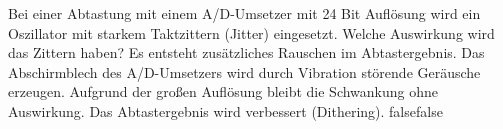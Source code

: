     {Bei einer Abtastung mit einem A/D-Umsetzer mit 24 Bit Auflösung wird ein Oszillator mit starkem Taktzittern (Jitter) eingesetzt. Welche Auswirkung wird das Zittern haben?}
    {Es entsteht zusätzliches Rauschen im Abtastergebnis.}
    {Das Abschirmblech des A/D-Umsetzers wird durch Vibration störende Geräusche erzeugen.}
    {Aufgrund der großen Auflösung bleibt die Schwankung ohne Auswirkung.}
    {Das Abtastergebnis wird verbessert (Dithering).}
    {false}{false}